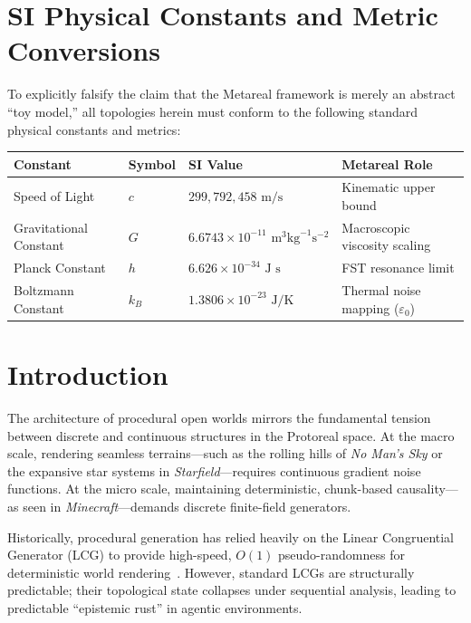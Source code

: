 \section*{SI Physical Constants and Metric Conversions}
To explicitly falsify the claim that the Metareal framework is merely an abstract ``toy model,'' all topologies herein must conform to the following standard physical constants and metrics:
\begin{table}[ht]
\centering
\renewcommand{\arraystretch}{1.2}
\begin{tabular}{@{}llll@{}}
\toprule
\textbf{Constant} & \textbf{Symbol} & \textbf{SI Value} & \textbf{Metareal Role} \\
\midrule
Speed of Light & $c$ & $299,792,458 \text{ m/s}$ & Kinematic upper bound \\
Gravitational Constant & $G$ & $6.6743 \times 10^{-11} \text{ m}^3 \text{kg}^{-1} \text{s}^{-2}$ & Macroscopic viscosity scaling \\
Planck Constant & $h$ & $6.626 \times 10^{-34} \text{ J s}$ & FST resonance limit \\
Boltzmann Constant & $k_B$ & $1.3806 \times 10^{-23} \text{ J/K}$ & Thermal noise mapping ($\varepsilon_0$) \\
\bottomrule
\end{tabular}
\end{table}

\section{Introduction}

The architecture of procedural open worlds mirrors the fundamental tension between discrete and continuous structures in the Protoreal space. At the macro scale, rendering seamless terrains---such as the rolling hills of \textit{No Man's Sky} or the expansive star systems in \textit{Starfield}---requires continuous gradient noise functions. At the micro scale, maintaining deterministic, chunk-based causality---as seen in \textit{Minecraft}---demands discrete finite-field generators. 

Historically, procedural generation has relied heavily on the Linear Congruential Generator (LCG) to provide high-speed, $O(1)$ pseudo-randomness for deterministic world rendering~\cite{persson_minecraft}. However, standard LCGs are structurally predictable; their topological state collapses under sequential analysis, leading to predictable ``epistemic rust'' in agentic environments. 

